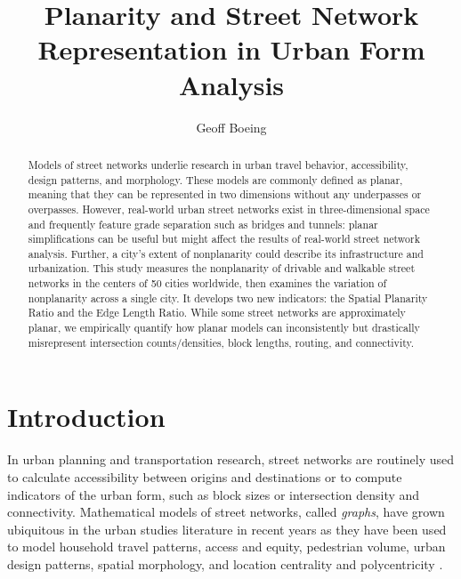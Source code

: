 \documentclass[Afour,sageh,times]{sagej}
\begin{document}
\title{Planarity and Street Network Representation in Urban Form Analysis}
\author{Geoff Boeing }


\begin{abstract}

Models of street networks underlie research in urban travel behavior, accessibility, design patterns, and morphology. These models are commonly defined as planar, meaning that they can be represented in two dimensions without any underpasses or overpasses. However, real-world urban street networks exist in three-dimensional space and frequently feature grade separation such as bridges and tunnels: planar simplifications can be useful but might affect the results of real-world street network analysis. Further, a city's extent of nonplanarity could describe its infrastructure and urbanization. This study measures the nonplanarity of drivable and walkable street networks in the centers of 50 cities worldwide, then examines the variation of nonplanarity across a single city. It develops two new indicators: the Spatial Planarity Ratio and the Edge Length Ratio. While some street networks are approximately planar, we empirically quantify how planar models can inconsistently but drastically misrepresent intersection counts/densities, block lengths, routing, and connectivity.

\end{abstract}


\maketitle

\section{Introduction}

In urban planning and transportation research, street networks are routinely used to calculate accessibility between origins and destinations or to compute indicators of the urban form, such as block sizes or intersection density and connectivity. Mathematical models of street networks, called \emph{graphs}, have grown ubiquitous in the urban studies literature in recent years as they have been used to model household travel patterns, access and equity, pedestrian volume, urban design patterns, spatial morphology, and location centrality and polycentricity \citep{marshall_street_2010,porta_alterations_2014,marshall_community_2014,hajrasouliha_impact_2015,parthasarathi_street_2015,knight_metrics_2015,gil_street_2016,zhong_revealing_2017}.
\end{document}
